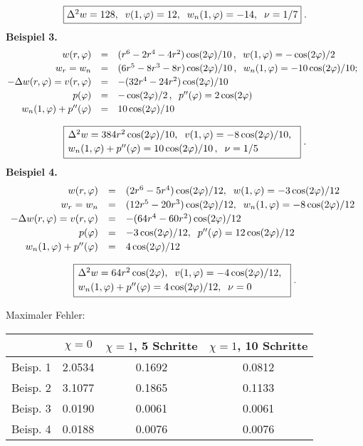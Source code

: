 \documentclass[12pt,a4paper,leqno]{book}
\begin{document}
\[
\fbox{$
\Delta^2w         =  128, \;\;
v(1,\phi ) = 12, \;\;
w_n(1,\phi )       =  - 14,\;\; \nu = 1/7
$} \; .
\]
{\bf Beispiel 3.}
\[
\ba{.}{rcl}
w(r,\phi ) &=& (r^6 - 2r^4 - 4r^2)\cos(2\phi )/10\,,\;\;
w(1,\phi) = - \cos(2\phi)/2\\[0.5ex]
w_r = w_n &=& (6r^5 - 8r^3 - 8r)\cos(2\phi )/10\,,\;\;
w_n(1,\phi) = - 10\cos(2\phi)/10;\\[0.5ex]
-\Delta w(r,\phi ) = v(r,\phi ) &=& -(32r^4 - 24r^2)\cos(2\phi )/10\\[0.5ex]
p(\phi) &=&  -\cos(2\phi)/2\,,\;\; p''(\phi) = 2\cos(2\phi)\\[0.5ex]
w_n(1,\phi ) + p''(\phi ) &=& 10\cos(2\phi )/10
\ea{.}
\]
\par
\[
\fbox{$
\ba{.}{ll}
\Delta^2w         =  384r^2\cos(2\phi)/10, \;\;
v(1,\phi ) = -8\cos(2\phi)/10, \\[0.5ex]
w_n(1,\phi ) + p''(\phi )      =  10\cos(2\phi )/10\,,\;\; \nu = 1/5
\ea{.}
$} \; .
\]
\newpage
{\bf Beispiel 4.}
\[
\ba{.}{rcl}
w(r,\phi ) &=& (2r^6 - 5r^4)\cos(2\phi )/12, \;\;
w(1,\phi) = - 3\cos(2\phi)/12\\[0.5ex]
w_r = w_n &=& (12r^5 - 20r^3)\cos(2\phi )/12,\;\;
w_n(1,\phi) = -8\cos(2\phi)/12\\[0.5ex]
- \Delta w(r,\phi ) = v(r,\phi ) &=& - (64r^4 - 60r^2)\cos(2\phi )/12\\[0.5ex]
p(\phi) &=& -3\cos(2\phi)/12,\;\; p''(\phi) = 12\cos(2\phi)/12\\[0.5ex]
w_n(1,\phi ) + p''(\phi ) &=& 4\cos(2\phi )/12
\ea{.}
\]
\par
\[
\fbox{$
\ba{.}{ll}
\Delta^2w =  64r^2\cos(2\phi), \;\;
v(1,\phi ) = - 4\cos(2\phi)/12, \\[0.5ex]
w_n(1,\phi ) + p''(\phi ) =  4\cos(2\phi )/12, \;\;
\nu  = 0
\ea{.}
$} \; .
\]

\renewcommand{\arraystretch}{1.5}
Maximaler Fehler:
\bc
\begin{tabular}{|c|c|c|c|} \hline
 & $\chi = 0$ & $\chi = 1$, 5 Schritte& $\chi = 1$, 10 Schritte  \\ \hline
Beisp. 1 & 2.0534   & 0.1692  & 0.0812 \\ \hline
Beisp. 2 & 3.1077   & 0.1865  & 0.1133 \\ \hline
Beisp. 3 & 0.0190   & 0.0061  & 0.0061 \\ \hline
Beisp. 4 & 0.0188   & 0.0076  & 0.0076 \\ \hline

\end{tabular}
\ec
\renewcommand{\arraystretch}{1}
\end{document}
